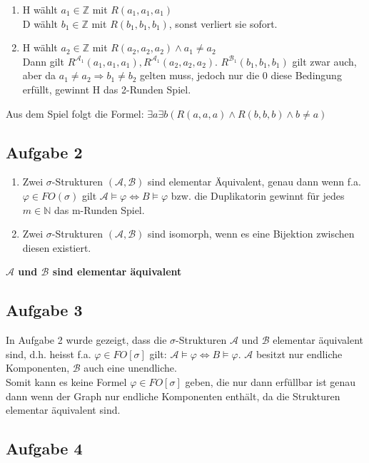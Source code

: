 \documentclass[a4paper,10pt]{article}
\newcommand{\N}{\mathbb{N}}
\newcommand{\Z}{\mathbb{Z}}
\begin{document}
\begin{enumerate}[(i)]
\begin{enumerate}[1. \text{Zug:}]
			\item  	H wählt $a_1 \in \mathbb{Z}$ mit $R(a_1,a_1,a_1)$ \\
				D wählt $b_1 \in \Z$ mit $R(b_1,b_1,b_1) $, sonst verliert sie sofort.
			\item  	H wählt $a_2 \in \mathbb{Z}$ mit $R(a_2,a_2,a_2) \land a_1 \neq a_2$ \\
			Dann gilt $R^{\mathcal{A}_1}(a_1,a_1,a_1), R^{\mathcal{A}_1}(a_2,a_2,a_2)$. $R^{\mathcal{B}_1}(b_1,b_1,b_1)$ gilt zwar auch, aber da $a_1 \neq a_2 \Rightarrow b_1 \neq b_2$ gelten muss, jedoch nur die $0$ diese Bedingung erfüllt, gewinnt H das 2-Runden Spiel.
			
		\end{enumerate}
	Aus dem Spiel folgt die Formel: $\exists a \exists b(R(a,a,a) \land R(b,b,b) \land b \neq a)$

\end{enumerate}
\subsection*{Aufgabe 2}
\begin{enumerate}
	\item 	Zwei $\sigma$-Strukturen $(\mathcal{A},\mathcal{B})$ sind elementar Äquivalent, genau dann wenn f.a. $\varphi \in FO(\sigma)$ gilt $\mathcal{A} \vDash \varphi \Leftrightarrow B \vDash \varphi$ bzw. die Duplikatorin gewinnt für jedes $m \in \N$ das m-Runden Spiel.
	\item  	Zwei $\sigma$-Strukturen $(\mathcal{A},\mathcal{B})$ sind isomorph, wenn es eine Bijektion zwischen diesen existiert.
\end{enumerate}

\textbf{$\mathcal{A}$ und $\mathcal{B}$ sind elementar äquivalent} \\



\subsection*{Aufgabe 3}
In Aufgabe 2 wurde gezeigt, dass die $\sigma$-Strukturen $\mathcal{A}$ und $\mathcal{B}$ elementar äquivalent sind, d.h. heisst f.a. $\varphi \in FO[\sigma]$ gilt: $\mathcal{A} \vDash \varphi \Leftrightarrow B \vDash \varphi$. $\mathcal{A}$ besitzt nur endliche Komponenten, $\mathcal{B}$ auch eine unendliche. \\Somit kann es keine Formel $\varphi \in FO[\sigma]$ geben, die nur dann erfüllbar ist genau dann wenn der Graph nur endliche Komponenten enthält, da die Strukturen elementar äquivalent sind.


\subsection*{Aufgabe 4}
\end{document}
